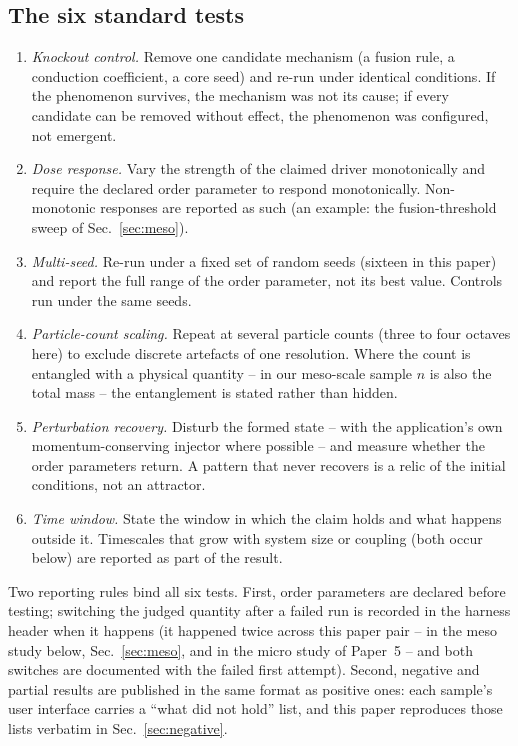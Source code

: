 \documentclass[aps,reprint,amsmath,amssymb,nofootinbib,superscriptaddress,floatfix]{revtex4-2}
\begin{document}
\subsection{The six standard tests}

\begin{enumerate}
\item \emph{Knockout control.} Remove one candidate mechanism (a fusion
  rule, a conduction coefficient, a core seed) and re-run under identical
  conditions. If the phenomenon survives, the mechanism was not its
  cause; if every candidate can be removed without effect, the
  phenomenon was configured, not emergent.
\item \emph{Dose response.} Vary the strength of the claimed driver
  monotonically and require the declared order parameter to respond
  monotonically. Non-monotonic responses are reported as such (an
  example: the fusion-threshold sweep of Sec.~\ref{sec:meso}).
\item \emph{Multi-seed.} Re-run under a fixed set of random seeds
  (sixteen in this paper) and report the full range of the order
  parameter, not its best value. Controls run under the same seeds.
\item \emph{Particle-count scaling.} Repeat at several particle counts
  (three to four octaves here) to exclude discrete artefacts of one
  resolution. Where the count is entangled with a physical quantity --
  in our meso-scale sample $n$ is also the total mass -- the entanglement
  is stated rather than hidden.
\item \emph{Perturbation recovery.} Disturb the formed state -- with the
  application's own momentum-conserving injector where possible -- and
  measure whether the order parameters return. A pattern that never
  recovers is a relic of the initial conditions, not an attractor.
\item \emph{Time window.} State the window in which the claim holds and
  what happens outside it. Timescales that grow with system size or
  coupling (both occur below) are reported as part of the result.
\end{enumerate}

Two reporting rules bind all six tests. First, order parameters are
declared before testing; switching the judged quantity after a failed
run is recorded in the harness header when it happens (it happened twice
across this paper pair -- in the meso study below, Sec.~\ref{sec:meso},
and in the micro study of Paper~5 -- and both
switches are documented with the failed first attempt). Second, negative
and partial results are published in the same format as positive ones:
each sample's user interface carries a ``what did not hold'' list, and
this paper reproduces those lists verbatim in
Sec.~\ref{sec:negative}.
\end{document}
